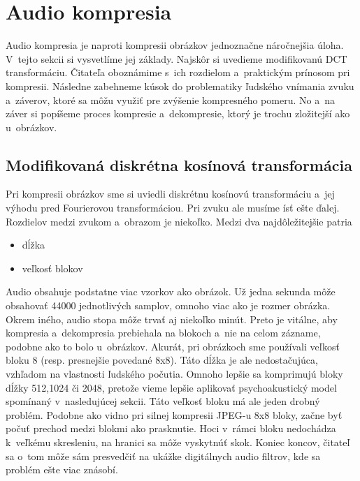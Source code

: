 \section{Audio kompresia}

Audio kompresia je naproti kompresii obrázkov jednoznačne náročnejšia
úloha. V~tejto sekcii si vysvetlíme jej základy. Najskôr si uvedieme
modifikovanú DCT transformáciu. Čitateľa oboznámime s~ich rozdielom 
a~praktickým prínosom pri kompresii. Následne zabehneme kúsok do
problematiky ľudského vnímania zvuku a~záverov, ktoré sa môžu využiť
pre zvýšenie kompresného pomeru. No a~na záver si popíšeme proces
kompresie a~dekompresie, ktorý je trochu zložitejší ako u~obrázkov.

\subsection{Modifikovaná diskrétna kosínová transformácia}
Pri kompresii obrázkov sme si uviedli diskrétnu kosínovú
transformáciu a~jej výhodu pred Fourierovou transformáciou. Pri zvuku
ale musíme ísť ešte ďalej. Rozdielov medzi zvukom a~obrazom je
niekoľko. Medzi dva najdôležitejšie patria
\begin{itemize}
\item dĺžka
\item veľkosť blokov
\end{itemize}
Audio obsahuje podstatne viac vzorkov ako obrázok. Už jedna sekunda
môže obsahovať 44000 jednotlivých samplov, omnoho viac ako je rozmer
obrázka. Okrem iného, audio stopa môže trvať aj niekoľko minút. Preto
je vitálne, aby kompresia a~dekompresia prebiehala na blokoch a~nie na
celom zázname, podobne ako to bolo u~obrázkov. Akurát, pri obrázkoch
sme používali veľkosť bloku 8 (resp. presnejšie povedané 8x8). Táto
dĺžka je ale nedostačujúca, vzhľadom na vlastnosti ľudského počutia.
Omnoho lepšie sa komprimujú bloky dĺžky 512,1024 či 2048, pretože
vieme lepšie aplikovať psychoakustický model spomínaný v~nasledujúcej
sekcii. Táto veľkosť bloku má ale jeden drobný problém. Podobne ako
vidno pri silnej kompresii JPEG-u 8x8 bloky, začne byť počuť prechod
medzi blokmi ako prasknutie. Hoci v~rámci bloku nedochádza k~veľkému
skresleniu, na hranici sa môže vyskytnúť skok. Koniec koncov, čitateľ
sa o~tom môže sám presvedčiť na ukážke digitálnych audio filtrov, kde
sa problém ešte viac znásobí.

